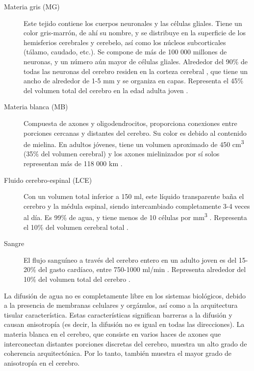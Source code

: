\begin{description}
\item[Materia gris (MG)] Este tejido contiene los cuerpos neuronales y las células gliales. Tiene un color gris-marrón, de ahí su nombre, y se distribuye en la superficie de los hemisferios cerebrales y cerebelo, así como los núcleos subcorticales (tálamo, caudado, etc.). Se compone de más de 100 000 millones de neuronas, y un número aún mayor de células gliales. Alrededor del 90\% de todas las neuronas del cerebro residen en la corteza cerebral \cite{Pakkenberg_1997}, que tiene un ancho de alrededor de 1-5 mm y se organiza en capas. Representa el 45\% del volumen total del cerebro en la edad adulta joven \cite{Rengachary_2004}.
\item[Materia blanca (MB)] Compuesta de axones y oligodendrocitos, proporciona conexiones entre porciones cercanas y distantes del cerebro. Su color es debido al contenido de mielina. En adultos jóvenes, tiene un volumen aproximado de 450 cm\textsuperscript{3} (35\% del volumen cerebral) y los axones mielinizados por sí solos representan más de 118 000 km \cite{Tang_1997}.
\item[Fluido cerebro-espinal (LCE)] Con un volumen total inferior a 150 ml, este líquido transparente baña el cerebro y la médula espinal, siendo intercambiado completamente 3-4 veces al día. Es 99\% de agua, y tiene menos de 10 células por mm\textsuperscript{3} \cite{Kandel_2000}. Representa el 10\% del volumen cerebral total \cite{Rengachary_2004}.
\item[Sangre] El flujo sanguíneo a través del cerebro entero en un adulto joven es del 15-20\% del gasto cardíaco, entre 750-1000 ml/min \cite{Kandel_2000}. Representa alrededor del 10\% del volumen total del cerebro \cite{Rengachary_2004}.
\end{description}

La difusión de agua no es completamente libre en los sistemas biológicos, debido a la presencia de membranas celulares y orgánulos, así como a la arquitectura tisular característica. Estas características significan barreras a la difusión y causan {\emph anisotropía} (es decir, la difusión no es igual en todas las direcciones). La materia blanca en el cerebro, que consiste en varios haces de axones que interconectan distantes porciones discretas del cerebro, muestra un alto grado de coherencia arquitectónica. Por lo tanto, también muestra el mayor grado de anisotropía en el cerebro.

